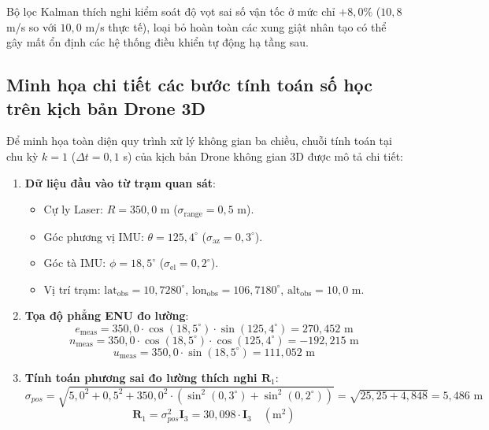 Bộ lọc Kalman thích nghi kiểm soát độ vọt sai số vận tốc ở mức chỉ $+8{,}0\%$ ($10{,}8$ m/s so với $10{,}0$ m/s thực tế), loại bỏ hoàn toàn các xung giật nhân tạo có thể gây mất ổn định các hệ thống điều khiển tự động hạ tầng sau.

\subsection{Minh họa chi tiết các bước tính toán số học trên kịch bản Drone 3D}

\hspace{0.5cm} Để minh họa toàn diện quy trình xử lý không gian ba chiều, chuỗi tính toán tại chu kỳ $k = 1$ ($\Delta t = 0{,}1$ s) của kịch bản Drone không gian 3D được mô tả chi tiết:

\begin{enumerate}
    \item \textbf{Dữ liệu đầu vào từ trạm quan sát}:
    \begin{itemize}
        \item Cự ly Laser: $R = 350{,}0$ m ($\sigma_{\text{range}} = 0{,}5$ m).
        \item Góc phương vị IMU: $\theta = 125{,}4^\circ$ ($\sigma_{\text{az}} = 0{,}3^\circ$).
        \item Góc tà IMU: $\phi = 18{,}5^\circ$ ($\sigma_{\text{el}} = 0{,}2^\circ$).
        \item Vị trí trạm: $\text{lat}_{\text{obs}} = 10{,}7280^\circ$, $\text{lon}_{\text{obs}} = 106{,}7180^\circ$, $\text{alt}_{\text{obs}} = 10{,}0$ m.
    \end{itemize}

    \item \textbf{Tọa độ phẳng ENU đo lường}:
    \begin{equation}
    e_{\text{meas}} = 350{,}0 \cdot \cos(18{,}5^\circ) \cdot \sin(125{,}4^\circ) = 270{,}452 \text{ m}
    \end{equation}
    \begin{equation}
    n_{\text{meas}} = 350{,}0 \cdot \cos(18{,}5^\circ) \cdot \cos(125{,}4^\circ) = -192{,}215 \text{ m}
    \end{equation}
    \begin{equation}
    u_{\text{meas}} = 350{,}0 \cdot \sin(18{,}5^\circ) = 111{,}052 \text{ m}
    \end{equation}

    \item \textbf{Tính toán phương sai đo lường thích nghi $\mathbf{R}_1$}:
    \begin{equation}
    \sigma_{pos} = \sqrt{5{,}0^2 + 0{,}5^2 + 350{,}0^2 \cdot \left(\sin^2(0{,}3^\circ) + \sin^2(0{,}2^\circ)\right)} = \sqrt{25{,}25 + 4{,}848} = 5{,}486 \text{ m}
    \end{equation}
    \begin{equation}
    \mathbf{R}_1 = \sigma_{pos}^2 \mathbf{I}_3 = 30{,}098 \cdot \mathbf{I}_3 \quad (\text{m}^2)
    \end{equation}


\end{enumerate}
